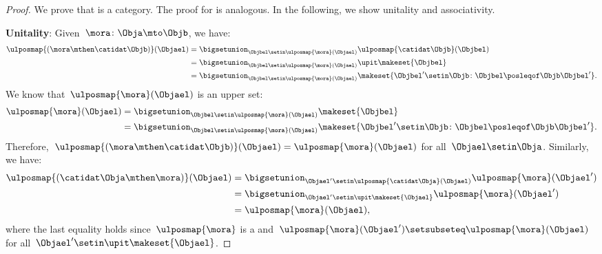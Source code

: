 \begin{proof}
    We prove that \UPos is a category.
    The proof for \LPos is analogous.
    In the following, we show unitality and associativity.

    \textbf{Unitality}:
    Given~$\mora\colon \Obja \mto \Objb$, we have:
    \begin{equation}
        \begin{aligned}
            \ulposmap{\left( \mora \mthen \catidat\Objb\right)}(\Objael) & =\bigsetunion_{\Objbel\setin \ulposmap{\mora}(\Objael)}\ulposmap{\catidat\Objb}(\Objbel) \\
                                                                         & =\bigsetunion_{\Objbel\setin \ulposmap{\mora}(\Objael)}\upit\makeset{\Objbel} \\
                                                                         & =\bigsetunion_{\Objbel\setin \ulposmap{\mora}(\Objael)}\makeset{\Objbel'\setin \Objb \colon \Objbel\posleqof\Objb \Objbel' }.
        \end{aligned}
    \end{equation}
    We know that~$\ulposmap{\mora}(\Objael)$ is an upper set:
    \begin{equation}
        \begin{aligned}
            \ulposmap{\mora}(\Objael) & =\bigsetunion_{\Objbel\setin \ulposmap{\mora}(\Objael)}\makeset{\Objbel} \\
                                      & =\bigsetunion_{\Objbel\setin \ulposmap{\mora}(\Objael)}\makeset{ \Objbel'\setin \Objb \colon \Objbel\posleqof\Objb \Objbel'}.
        \end{aligned}
    \end{equation}
    Therefore,~$\ulposmap{\left( \mora \mthen \catidat\Objb\right)}(\Objael)=\ulposmap{\mora}(\Objael)$ for all~$\Objael\setin \Obja$.
    Similarly, we have:
    \begin{equation}
        \begin{aligned}
            \ulposmap{(\catidat\Obja \mthen \mora)}(\Objael) & =\bigsetunion_{\Objael'\setin \ulposmap{\catidat\Obja}(\Objael)}\ulposmap{\mora}(\Objael') \\
                                                             & =\bigsetunion_{\Objael'\setin \upit \makeset{\Objael}}\ulposmap{\mora}(\Objael') \\
                                                             & =\ulposmap{\mora}(\Objael),
        \end{aligned}
    \end{equation}
    where the last equality holds since~$\ulposmap{\mora}$ is a  and~$\ulposmap{\mora}(\Objael')\setsubseteq \ulposmap{\mora}(\Objael)$ for all~$\Objael'\setin \upit \makeset{\Objael}$.


\end{proof}
